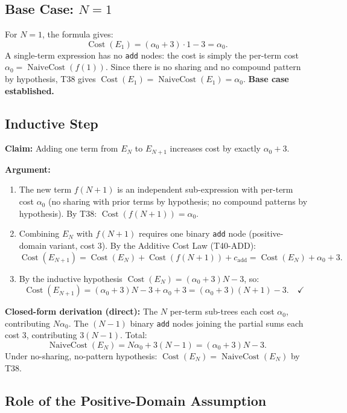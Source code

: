 \documentclass[12pt,a4paper]{article}
\theoremstyle{definition}
\newcommand{\Cost}{\operatorname{Cost}}
\newcommand{\NC}{\operatorname{NaiveCost}}
\begin{document}
\subsection{Base Case: $N = 1$}

For $N = 1$, the formula gives:
\[
  \Cost(E_1) = (\alpha_0 + 3) \cdot 1 - 3 = \alpha_0.
\]
A single-term expression has no \texttt{add} nodes: the cost is simply the
per-term cost $\alpha_0 = \NC(f(1))$.  Since there is no sharing and no
compound pattern by hypothesis, T38 gives $\Cost(E_1) = \NC(E_1) = \alpha_0$.
\textbf{Base case established.}

\subsection{Inductive Step}

\textbf{Claim:}  Adding one term from $E_N$ to $E_{N+1}$ increases cost
by exactly $\alpha_0 + 3$.

\textbf{Argument:}
\begin{enumerate}
  \item The new term $f(N+1)$ is an independent sub-expression with per-term
        cost $\alpha_0$ (no sharing with prior terms by hypothesis; no compound
        patterns by hypothesis).  By T38: $\Cost(f(N+1)) = \alpha_0$.
  \item Combining $E_N$ with $f(N+1)$ requires one binary \texttt{add} node
        (positive-domain variant, cost 3).  By the Additive Cost Law (T40-ADD):
        \[
          \Cost(E_{N+1}) = \Cost(E_N) + \Cost(f(N+1)) + c_{\mathrm{add}}
                         = \Cost(E_N) + \alpha_0 + 3.
        \]
  \item By the inductive hypothesis $\Cost(E_N) = (\alpha_0+3)N - 3$, so:
        \[
          \Cost(E_{N+1}) = (\alpha_0+3)N - 3 + \alpha_0 + 3
                         = (\alpha_0+3)(N+1) - 3. \quad \checkmark
        \]
\end{enumerate}

\textbf{Closed-form derivation (direct):}
The $N$ per-term sub-trees each cost $\alpha_0$, contributing $N\alpha_0$.
The $(N-1)$ binary \texttt{add} nodes joining the partial sums each cost 3,
contributing $3(N-1)$.  Total:
\[
  \NC(E_N) = N\alpha_0 + 3(N-1) = (\alpha_0 + 3)N - 3.
\]
Under no-sharing, no-pattern hypothesis: $\Cost(E_N) = \NC(E_N)$ by T38.

\subsection{Role of the Positive-Domain Assumption}
\end{document}
